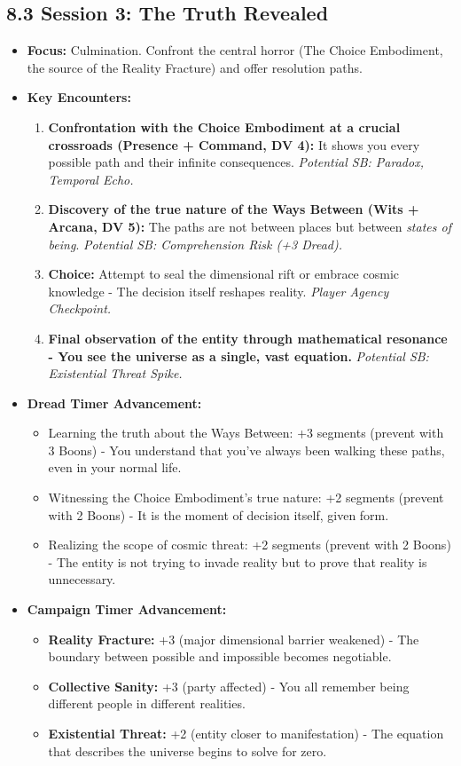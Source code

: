 \documentclass[11pt]{article}
\begin{document}
\subsection*{8.3 Session 3: The Truth Revealed}

\begin{itemize}
\item \textbf{Focus:} Culmination. Confront the central horror (The Choice Embodiment, the source of the Reality Fracture) and offer resolution paths.
\item \textbf{Key Encounters:}
\begin{enumerate}
\item \textbf{Confrontation with the Choice Embodiment at a crucial crossroads (Presence + Command, DV 4):} It shows you every possible path and their infinite consequences. \textit{Potential SB: Paradox, Temporal Echo.}
\item \textbf{Discovery of the true nature of the Ways Between (Wits + Arcana, DV 5):} The paths are not between places but between \textit{states of being}. \textit{Potential SB: Comprehension Risk (+3 Dread).}
\item \textbf{Choice:} Attempt to seal the dimensional rift or embrace cosmic knowledge - The decision itself reshapes reality. \textit{Player Agency Checkpoint.}
\item \textbf{Final observation of the entity through mathematical resonance - You see the universe as a single, vast equation.} \textit{Potential SB: Existential Threat Spike.}
\end{enumerate}
\item \textbf{Dread Timer Advancement:}
\begin{itemize}
\item Learning the truth about the Ways Between: +3 segments (prevent with 3 Boons) - You understand that you've always been walking these paths, even in your normal life.
\item Witnessing the Choice Embodiment's true nature: +2 segments (prevent with 2 Boons) - It is the moment of decision itself, given form.
\item Realizing the scope of cosmic threat: +2 segments (prevent with 2 Boons) - The entity is not trying to invade reality but to prove that reality is unnecessary.
\end{itemize}
\item \textbf{Campaign Timer Advancement:}
\begin{itemize}
\item \textbf{Reality Fracture:} +3 (major dimensional barrier weakened) - The boundary between possible and impossible becomes negotiable.
\item \textbf{Collective Sanity:} +3 (party affected) - You all remember being different people in different realities.
\item \textbf{Existential Threat:} +2 (entity closer to manifestation) - The equation that describes the universe begins to solve for zero.
\end{itemize}
\end{itemize}
\end{document}
